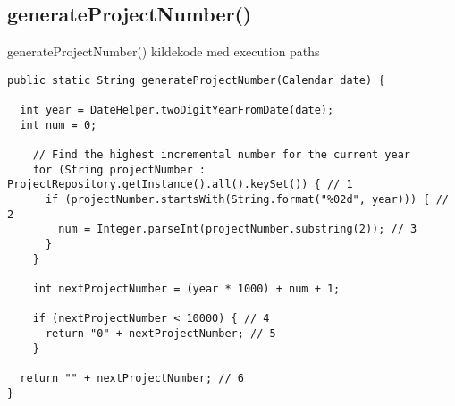 \subsection{generateProjectNumber()} \label{sec:white_box_generate_project_number}


\begin{listing}[H]
    \centering
    \caption{generateProjectNumber() kildekode med execution paths}\label{lst:generate_project_number}
    \begin{verbatim}
public static String generateProjectNumber(Calendar date) {

  int year = DateHelper.twoDigitYearFromDate(date);
  int num = 0;

    // Find the highest incremental number for the current year
    for (String projectNumber : ProjectRepository.getInstance().all().keySet()) { // 1
      if (projectNumber.startsWith(String.format("%02d", year))) { // 2
        num = Integer.parseInt(projectNumber.substring(2)); // 3
      }
    }

    int nextProjectNumber = (year * 1000) + num + 1;

    if (nextProjectNumber < 10000) { // 4
      return "0" + nextProjectNumber; // 5
    }

  return "" + nextProjectNumber; // 6
}
    \end{verbatim}
\end{listing}

